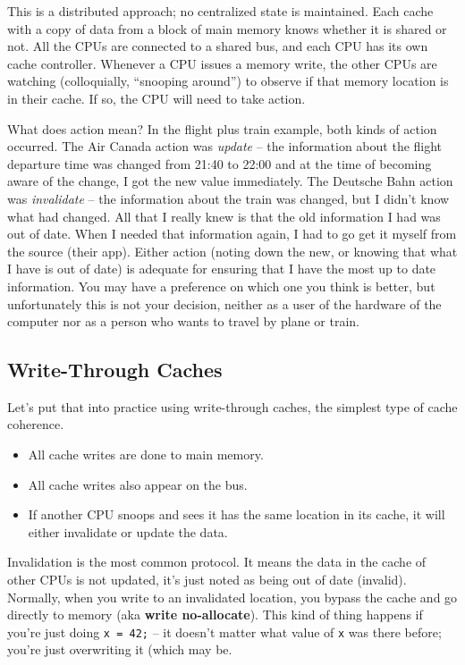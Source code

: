 \documentclass[a4paper]{report}
\begin{document}
This is a distributed approach; no centralized state is maintained. Each cache with a copy of data from a block of main memory knows whether it is shared or not. All the CPUs are connected to a shared bus, and each CPU has its own cache controller. Whenever a CPU issues a memory write, the other CPUs are watching (colloquially, ``snooping around'') to observe if that memory location is in their cache. If so, the CPU will need to take action.

What does action mean? In the flight plus train example, both kinds of action occurred. The Air Canada action was \textit{update} -- the information about the flight departure time was changed from 21:40 to 22:00 and at the time of becoming aware of the change, I got the new value immediately. The Deutsche Bahn action was \textit{invalidate} -- the information about the train was changed, but I didn't know what had changed. All that I really knew is that the old information I had was out of date. When I needed that information again, I had to go get it myself from the source (their app). Either action (noting down the new, or knowing that what I have is out of date) is adequate for ensuring that I have the most up to date information. You may have a preference on which one you think is better, but unfortunately this is not your decision, neither as a user of the hardware of the computer nor as  a person who wants to travel by plane or train.

\subsection*{Write-Through Caches}
Let's put that into practice using write-through caches, the simplest type of
cache coherence.
  \begin{itemize}
    \item All cache writes are done to main memory.
    \item All cache writes also appear on the bus.
    \item If another CPU snoops and sees it has the same location in
      its cache, it will either invalidate or update the
      data.
  \end{itemize}
  
Invalidation is the most common protocol. It means the data in the cache of other CPUs is not updated, it's just noted as being out of date (invalid).  Normally, when you write to an invalidated location, you bypass the cache and go directly to memory (aka {\bf write no-allocate}). This kind of thing happens if you're just doing \texttt{x = 42;} -- it doesn't matter what value of \texttt{x} was there before; you're just overwriting it (which may be.
\end{document}
